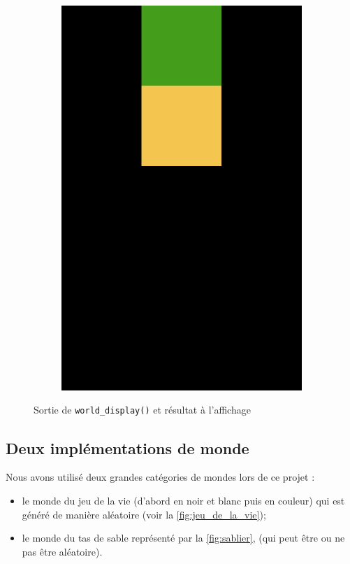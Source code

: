 \begin{figure}[ht]
\begin{subfigure}{0.15\textwidth}
        \includegraphics[width=\textwidth]{img/chap3/TestConflict2.png}
    \end{subfigure}
    \hspace*{\fill}
    \caption{Sortie de \texttt{world\_display()} et résultat à l'affichage}
    \label{fig:WorldDisplay}
\end{figure}

\newpage
\subsection{Deux implémentations de monde}
\label{sec:ImplementationMonde}
Nous avons utilisé deux grandes catégories de mondes  lors de ce projet :
\begin{itemize}
    \item le monde du jeu de la vie (d'abord en noir et blanc puis en couleur) qui est généré de manière aléatoire (voir la \autoref{fig:jeu_de_la_vie});
    \item le monde du tas de sable représenté par la \autoref{fig:sablier}, (qui peut être ou ne pas être aléatoire).
\end{itemize}
\vspace{\parskip}


